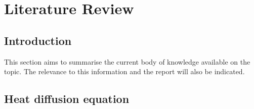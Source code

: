 \chapter{Literature Review}
\section{Introduction}
This section aims to summarise the current body of knowledge available on the topic. 
The relevance to this information and the report will also be indicated. 
	
	
	
	\section{Heat diffusion equation}
	